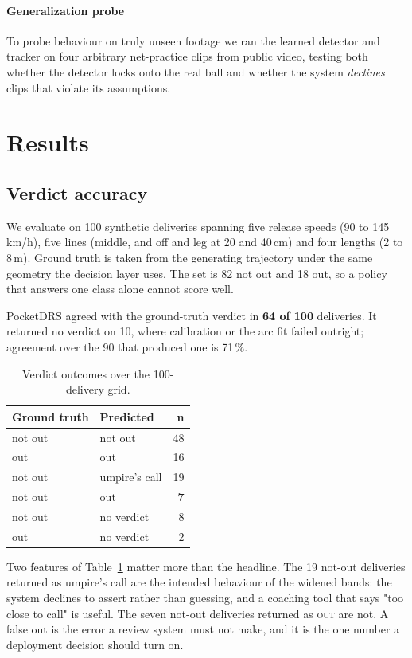 \documentclass[journal]{IEEEtran}
\begin{document}
\paragraph*{Generalization probe} To probe behaviour on truly unseen footage we
ran the learned detector and tracker on four arbitrary net-practice clips from
public video, testing both whether the detector locks onto the real ball and
whether the system \emph{declines} clips that violate its assumptions.

\section{Results}
\label{sec:results}

\subsection{Verdict accuracy}
We evaluate on 100 synthetic deliveries spanning five release speeds (90 to 145\,km/h), five
lines (middle, and off and leg at 20 and 40\,cm) and four lengths (2 to 8\,m). Ground truth is
taken from the generating trajectory under the same geometry the decision layer uses. The set is
82 not out and 18 out, so a policy that answers one class alone cannot score well.

PocketDRS agreed with the ground-truth verdict in \textbf{64 of 100} deliveries. It returned no
verdict on 10, where calibration or the arc fit failed outright; agreement over the 90 that
produced one is 71\,\%.

\begin{table}[!t]
\caption{Verdict outcomes over the 100-delivery grid.}
\label{tab:wide}
\centering
\begin{tabular}{@{}llr@{}}
\toprule
\textbf{Ground truth} & \textbf{Predicted} & \textbf{n}\\
\midrule
not out & not out       & 48\\
out     & out           & 16\\
not out & umpire's call & 19\\
not out & out           & \textbf{7}\\
not out & no verdict    & 8\\
out     & no verdict    & 2\\
\bottomrule
\end{tabular}
\end{table}

Two features of Table~\ref{tab:wide} matter more than the headline. The 19 not-out deliveries
returned as umpire's call are the intended behaviour of the widened bands: the system declines to
assert rather than guessing, and a coaching tool that says "too close to call" is useful. The
seven not-out deliveries returned as \textsc{out} are not. A false out is the error a review
system must not make, and it is the one number a deployment decision should turn on.
\end{document}

